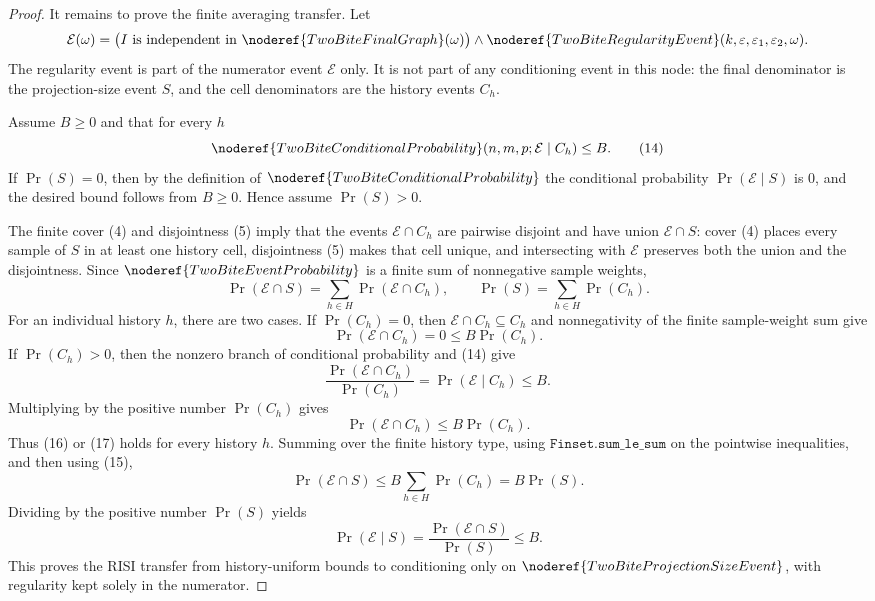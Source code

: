 \begin{proof}
It remains to prove the finite averaging transfer.  Let
\[
\mathcal E(\omega)=
\bigl(I\text{ is independent in }\noderef{TwoBiteFinalGraph}(\omega)\bigr)
\land
\noderef{TwoBiteRegularityEvent}
      (k,\varepsilon,\varepsilon_1,\varepsilon_2,\omega).
\]
The regularity event is part of the numerator event \(\mathcal E\) only.  It
is not part of any conditioning event in this node: the final denominator is
the projection-size event \(S\), and the cell denominators are the history
events \(C_h\).

Assume \(B\ge0\) and that for every \(h\)
\[
\noderef{TwoBiteConditionalProbability}(n,m,p;\mathcal E\mid C_h)\le B.
\tag{14}
\]
If \(\Pr(S)=0\), then by the definition of
\(\noderef{TwoBiteConditionalProbability}\) the conditional probability
\(\Pr(\mathcal E\mid S)\) is \(0\), and the desired bound follows from
\(B\ge0\).  Hence assume \(\Pr(S)>0\).

The finite cover (4) and disjointness (5) imply that the events
\(\mathcal E\cap C_h\) are pairwise disjoint and have union
\(\mathcal E\cap S\): cover (4) places every sample of \(S\) in at least one
history cell, disjointness (5) makes that cell unique, and intersecting with
\(\mathcal E\) preserves both the union and the disjointness.  Since
\(\noderef{TwoBiteEventProbability}\) is a finite sum of nonnegative sample
weights,
\[
\Pr(\mathcal E\cap S)=\sum_{h\in H}\Pr(\mathcal E\cap C_h),
\qquad
\Pr(S)=\sum_{h\in H}\Pr(C_h). \tag{15}
\]
For an individual history \(h\), there are two cases.  If \(\Pr(C_h)=0\),
then \(\mathcal E\cap C_h\subseteq C_h\) and nonnegativity of the finite
sample-weight sum give
\[
\Pr(\mathcal E\cap C_h)=0\le B\Pr(C_h). \tag{16}
\]
If \(\Pr(C_h)>0\), then the nonzero branch of conditional probability and
(14) give
\[
\frac{\Pr(\mathcal E\cap C_h)}{\Pr(C_h)}
=\Pr(\mathcal E\mid C_h)\le B.
\]
Multiplying by the positive number \(\Pr(C_h)\) gives
\[
\Pr(\mathcal E\cap C_h)\le B\Pr(C_h). \tag{17}
\]
Thus (16) or (17) holds for every history \(h\).  Summing over the finite
history type, using \(\texttt{Finset.sum\_le\_sum}\) on the pointwise
inequalities, and then using (15),
\[
\Pr(\mathcal E\cap S)
\le
B\sum_{h\in H}\Pr(C_h)
=B\Pr(S).
\]
Dividing by the positive number \(\Pr(S)\) yields
\[
\Pr(\mathcal E\mid S)
=\frac{\Pr(\mathcal E\cap S)}{\Pr(S)}
\le B.
\]
This proves the RISI transfer from history-uniform bounds to conditioning
only on \(\noderef{TwoBiteProjectionSizeEvent}\), with regularity kept
solely in the numerator.
\end{proof}
